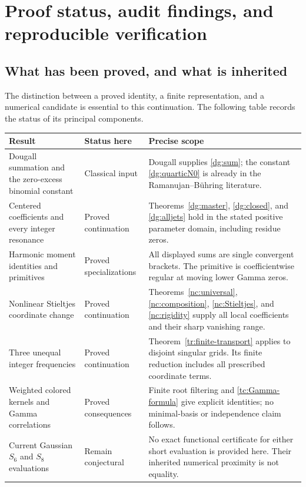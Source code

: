 \section{Proof status, audit findings, and reproducible verification}
\label{sec:audit}

\subsection{What has been proved, and what is inherited}
The distinction between a proved identity, a finite representation,
and a numerical candidate is essential to this continuation. The
following table records the status of its principal components.

\begin{longtable}{@{}>{\raggedright\arraybackslash}p{.26\linewidth}
>{\raggedright\arraybackslash}p{.19\linewidth}
>{\raggedright\arraybackslash}p{.49\linewidth}@{}}
\toprule
Result & Status here & Precise scope\\
\midrule
\endhead
Dougall summation and the zero-excess binomial constant &
Classical input &
Dougall supplies \eqref{dg:sum}; the constant
\eqref{dg:quarticN0} is already in the Ramanujan--B\"uhring literature.\\
\addlinespace
Centered coefficients and every integer resonance &
Proved continuation &
Theorems~\ref{dg:master}, \ref{dg:closed}, and \ref{dg:alljets}
hold in the stated positive parameter domain, including residue zeros.\\
\addlinespace
Harmonic moment identities and primitives &
Proved specializations &
All displayed sums are single convergent brackets. The primitive is
coefficientwise regular at moving lower Gamma zeros.\\
\addlinespace
Nonlinear Stieltjes coordinate change &
Proved continuation &
Theorems~\ref{nc:universal}, \ref{nc:composition},
\ref{nc:Stieltjes}, and \ref{nc:rigidity} supply all local coefficients
and their sharp vanishing range.\\
\addlinespace
Three unequal integer frequencies &
Proved continuation &
Theorem~\ref{tr:finite-transport} applies to disjoint singular grids.
Its finite reduction includes all prescribed coordinate terms.\\
\addlinespace
Weighted colored kernels and Gamma correlations &
Proved consequences &
Finite root filtering and \eqref{tc:Gamma-formula} give explicit
identities; no minimal-basis or independence claim follows.\\
\addlinespace
Current Gaussian $S_6$ and $S_8$ evaluations &
Remain conjectural &
No exact functional certificate for either short evaluation is
provided here. Their inherited numerical proximity is not equality.\\
\bottomrule
\end{longtable}

